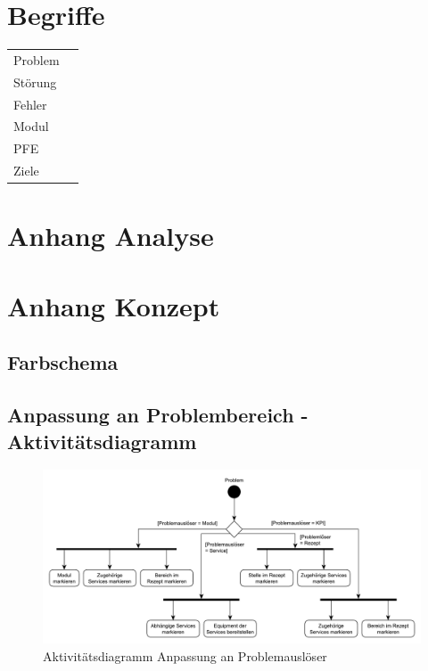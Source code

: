 \chapter{Begriffe}
    


\begin{table}[htbp]
\begin{tabular}{ll}
Problem & \\
Störung & \\
Fehler & \\
Modul & \\
PFE & \\
Ziele & \\
\end{tabular}
\end{table}

\chapter{Anhang Analyse}


\chapter{Anhang Konzept}
\section{Farbschema}

\section{Anpassung an Problembereich - Aktivitätsdiagramm}

\begin{figure}[htbp]
\centering
\includegraphics[angle=90,scale=0.6]{DA_files/UML/Anhang/Aktivitaetsdiagramm-Problem.pdf}
\caption{Aktivitätsdiagramm Anpassung an Problemauslöser}
\end{figure}

